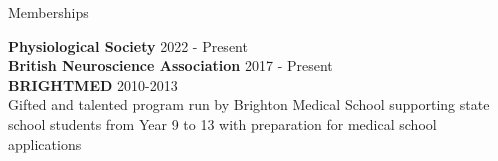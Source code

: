 \documentclass{resume} %
\begin{document}

\begin{rSection}{Memberships}

{\textbf{Physiological Society} \hfill{2022 - Present}}\\
{\textbf{British Neuroscience Association} \hfill{2017 - Present}}\\
{\textbf{BRIGHTMED}} \hfill{2010-2013}\\ 
Gifted and talented program run by Brighton Medical School supporting state school students from Year 9 to 13 with preparation for medical school applications
\end{rSection}


 

\end{document}
